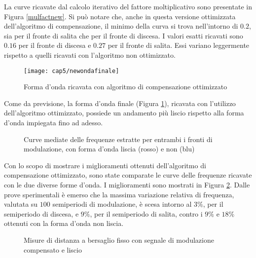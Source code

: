La curve ricavate dal calcolo iterativo del fattore moltiplicativo sono presentate in Figura \ref{mulfactnew}. Si può notare che, anche in questa versione ottimizzata dell'algoritmo di compensazione, il minimo della curva si trova nell'intorno di $0.2$, sia per il fronte di salita che per il fronte di discesa. I valori esatti ricavati sono $0.16$ per il fronte di discesa e $0.27$ per il fronte di salita. Essi variano leggermente rispetto a quelli ricavati con l'algoritmo non ottimizzato. 
\begin{figure}  
  \begin{center}
    \texttt{[image: cap5/newondafinale]}
    \caption{Forma d'onda ricavata con algoritmo di compensazione ottimizzato}
    \label{newondafinale}
  \end{center}
\end{figure}

Come da previsione, la forma d'onda finale (Figura \ref{newondafinale}), ricavata con l'utilizzo dell'algoritmo ottimizzato, possiede un andamento più liscio rispetto alla forma d'onda impiegata fino ad adesso.

\begin{figure}
\centering
{}
\hspace{5mm}
\caption{Curve mediate delle frequenze estratte per entrambi i fronti di modulazione, con forma d'onda liscia (rosso) e non (blu)}\label{primadopocompnew}
\end{figure}

Con lo scopo di mostrare i miglioramenti ottenuti dell'algoritmo di compensazione ottimizzato, sono state comparate le curve delle frequenze ricavate con le due diverse forme d'onda. I miglioramenti sono mostrati in Figura \ref{primadopocompnew}. Dalle prove sperimentali è emerso che la massima variazione relativa di frequenza, valutata su $100$ semiperiodi di modulazione, è scesa intorno al $3\%$, per il semiperiodo di discesa, e $9\%$, per il semiperiodo di salita, contro i $9\%$ e $18\%$ ottenuti con la forma d'onda non liscia.

\begin{figure}
\centering
{}
\hspace{5mm}
\caption{Misure di distanza a bersaglio fisso con segnale di modulazione compensato e liscio}\label{fissomodliscio}
\end{figure}

